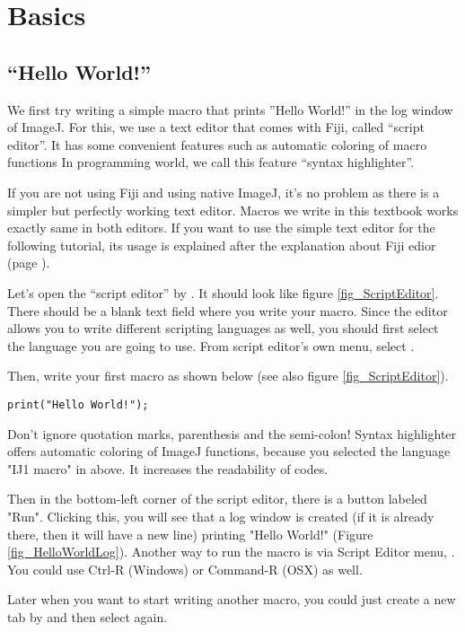 \section{Basics}
\label{sec:ImageJMacroBasics}

\subsection{``Hello World!''}
We first try writing a simple macro that prints ''Hello World!'' in the log window of ImageJ. For this, we use a text editor that comes with Fiji, called ``script editor''. 
It has some convenient features such as automatic coloring of macro functions {In programming world, we call this feature ``syntax highlighter''}.

If you are not using Fiji and using native ImageJ, it's no problem as there is a simpler but perfectly working text editor. Macros we write in this textbook works exactly same in both editors. If you want to use the simple text editor for the following tutorial, its usage is explained after the explanation about Fiji edior (page \pageref{part:nativeeditor}).

Let's open the ``script editor'' 
by . It should look like figure \ref{fig_ScriptEditor}.
There should be a blank text field where you write your macro. Since the editor allows you to write different scripting languages as well, you should first select the language you are going to use.  
From script editor's own menu, select .

Then, write your first macro as shown below (see also figure \ref{fig_ScriptEditor}). \\

\begin{lstlisting}[numbers=none]
print("Hello World!");

\end{lstlisting}

Don't ignore quotation marks, parenthesis and the semi-colon! 
Syntax highlighter offers automatic coloring of ImageJ functions, because you selected the language "IJ1 macro" in above. It increases the readability of codes.

Then in the bottom-left corner of the script editor, there is a button labeled "Run". Clicking this, you will see that a log window is created (if it is already there, then it will have a new line) printing "Hello World!" (Figure \ref{fig_HelloWorldLog}). Another way to run the macro is via Script Editor menu,   . You could use Ctrl-R (Windows) or Command-R (OSX) as well.

Later when you want to start writing another macro, you could just create a new tab by  and then select  again.